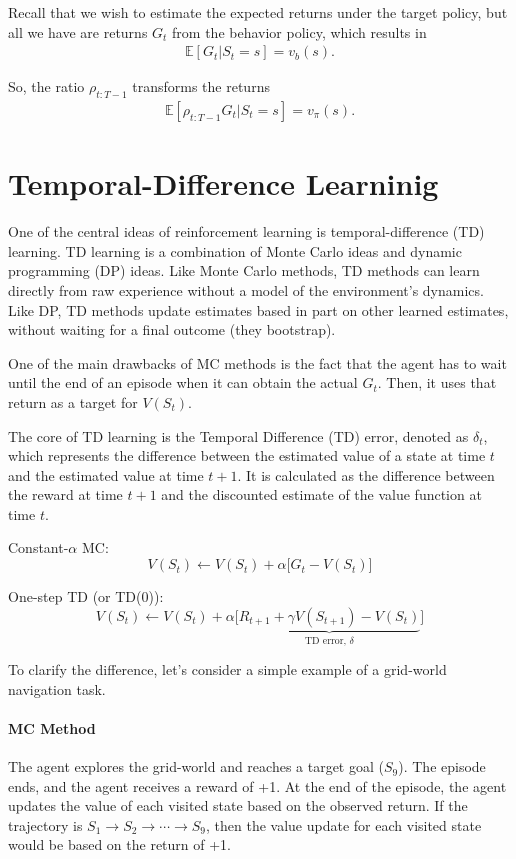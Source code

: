 Recall that we wish to estimate the expected returns under the target policy, but all we have are returns $G_t$ from the behavior policy, which results in 
\begin{align*}
	\mathbb{E}[G_t|S_t=s] = v_b(s).
\end{align*}

So, the ratio $\rho_{t:T-1}$ transforms the returns
\begin{align*}
	\mathbb{E}[\rho_{t:T-1} G_t|S_t=s] = v_\pi(s).
\end{align*}

\section{Temporal-Difference Learninig}
One of the central ideas of reinforcement learning is temporal-difference (TD) learning. TD learning is a combination of Monte Carlo ideas and dynamic programming (DP) ideas. Like Monte Carlo methods, TD methods can learn directly from raw experience without a model of the environment's dynamics. Like DP, TD methods update estimates based in part on other learned estimates, without waiting for a final outcome (they bootstrap). 

One of the main drawbacks of MC methods is the fact that the agent has to wait until the end of an episode when it can obtain the actual $G_t$. Then, it uses that return as a target for $V(S_t)$.


The core of TD learning is the Temporal Difference (TD) error, denoted as $\delta_t$, which represents the difference between the estimated value of a state at time $t$ and the estimated value at time $t+1$. It is calculated as the difference between the reward at time $t+1$ and the discounted estimate of the value function at time $t$.

Constant-$\alpha$ MC:
$$V(S_t) \leftarrow V(S_t)+ \alpha \Big[G_t-V(S_t)\Big] $$

One-step TD (or TD(0)):
$$V(S_t) \leftarrow V(S_t)+ \alpha \Big[\underbrace{R_{t+1}+\gamma V(S_{t+1})-V(S_t)}_{\text{TD error, $\delta$}}\Big] $$

To clarify the difference, let's consider a simple example of a grid-world navigation task. 

\paragraph{MC Method} The agent explores the grid-world and reaches a target goal ($S_9$). The episode ends, and the agent receives a reward of +1. At the end of the episode, the agent updates the value of each visited state based on the observed return. If the trajectory is $S_1\to S_2 \to \cdots\to S_9$, then the value update for each visited state would be based on the return of +1.

